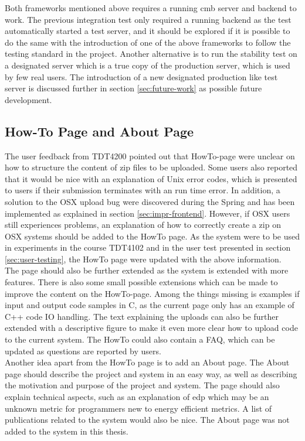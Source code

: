 Both frameworks mentioned above requires a running \gls{cmb} server and backend to work. The previous integration test only required a running backend as the test automatically started a test server, and it should be explored if it is possible to do the same with the introduction of one of the above frameworks to follow the testing standard in the project. Another alternative is to run the stability test on a designated server which is a true copy of the production server, which is used by few real users. The introduction of a new designated production like test server is discussed further in section \ref{sec:future-work} as possible future development.

\subsection{How-To Page and About Page}
The user feedback from TDT4200 \cite{TDT4200} pointed out that HowTo-page were unclear on how to structure the content of zip files to be uploaded. Some users also reported that it would be nice with an explanation of Unix error codes, which is presented to users if their submission terminates with an run time error. In addition, a solution to the OSX upload bug were discovered during the Spring and has been implemented as explained in section \ref{sec:impr-frontend}. However, if OSX users still experiences problems, an explanation of how to correctly create a zip on OSX systems should be added to the HowTo page. As the system were to be used in experiments in the course TDT4102 \cite{TDT4102} and in the user test presented in section \ref{sec:user-testing}, the HowTo page were updated with the above information. \\

The page should also be further extended as the system is extended with more features. There is also some small possible extensions which can be made to improve the content on the HowTo-page. Among the things missing is examples if input and output code samples in C, as the current page only has an example of C++ code IO handling. The text explaining the uploads can also be further extended with a descriptive figure to make it even more clear how to upload code to the current system. The HowTo could also contain a FAQ, which can be updated as questions are reported by users. \\

Another idea apart from the HowTo page is to add an About page. The About page should describe the project and system in an easy way, as well as describing the motivation and purpose of the project and system. The page should also explain technical aspects, such as an explanation of \gls{edp} which may be an unknown metric for programmers new to energy efficient metrics. A list of publications related to the system would also be nice. The About page was not added to the system in this thesis.

